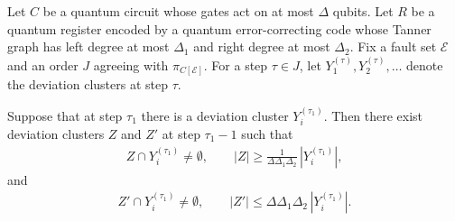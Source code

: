 \begin{claim}
  \label{claim:deviation_clusters}
  Let $C$ be a quantum circuit whose gates act on at most $\Delta$ qubits. Let $R$ be a quantum register encoded by a quantum error-correcting code whose Tanner graph has left degree at most $\Delta_{1}$ and right degree at most $\Delta_{2}$. Fix a fault set $\mathcal{E}$ and an order $J$ agreeing with $\pi_{C[\mathcal{E}]}$. For a step $\tau\in J$, let $Y_{1}^{(\tau)},Y_{2}^{(\tau)},\ldots$ denote the deviation clusters at step $\tau$.

  Suppose that at step $\tau_{1}$ there is a deviation cluster $Y_i^{(\tau_{1})}$. Then there exist deviation clusters $Z$ and $Z'$ at step $\tau_{1}-1$ such that
  \begin{equation*}
    \begin{split}
      Z\cap Y_i^{(\tau_{1})} \neq \emptyset,
      \qquad
      |Z| \ge \frac{1}{\Delta\Delta_{1}\Delta_{2}}\,|Y_i^{(\tau_{1})}|,
    \end{split}
  \end{equation*}
  and
  \begin{equation*}
    \begin{split}
      Z'\cap Y_i^{(\tau_{1})} \neq \emptyset,
      \qquad
      |Z'| \le \Delta\Delta_{1}\Delta_{2}\,|Y_i^{(\tau_{1})}|.
    \end{split}
  \end{equation*}
\end{claim}
